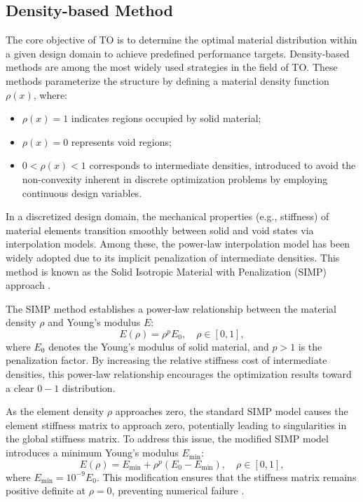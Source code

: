 \documentclass[mathpazo]{cicp}
\begin{document}
\subsection{Density-based Method}
The core objective of TO is to determine the optimal material distribution within a given design domain to achieve predefined performance targets. Density-based methods are among the most widely used strategies in the field of TO. These methods parameterize the structure by defining a material density function $\rho(x)$, where:
\begin{itemize}
	\item $\rho(x) = 1$ indicates regions occupied by solid material;
	\item $\rho(x) = 0$ represents void regions;
	\item $0 < \rho(x) < 1$ corresponds to intermediate densities, introduced to avoid the non-convexity inherent in discrete optimization problems by employing continuous design variables.
\end{itemize}

In a discretized design domain, the mechanical properties (e.g., stiffness) of material elements transition smoothly between solid and void states via interpolation models\cite{bendsoe1989optimal}. Among these, the power-law interpolation model has been widely adopted due to its implicit penalization of intermediate densities. This method is known as the Solid Isotropic Material with Penalization (SIMP) approach \cite{zhou1991coc}.

The SIMP method establishes a power-law relationship between the material density $\rho$ and Young's modulus $E$:
\begin{equation*}
	E(\rho) = \rho^p E_0,\quad \rho \in [0,1],
\end{equation*}
where $E_0$ denotes the Young's modulus of solid material, and $p>1$ is the penalization factor. By increasing the relative stiffness cost of intermediate densities, this power-law relationship encourages the optimization results toward a clear $0-1$ distribution.

As the element density $\rho$ approaches zero, the standard SIMP model causes the element stiffness matrix to approach zero, potentially leading to singularities in the global stiffness matrix. To address this issue, the modified SIMP model introduces a minimum Young's modulus $E_{\min}$:
\begin{equation*}
	E(\rho) = E_{\min} + \rho^p(E_0 - E_{\min}),\quad \rho \in [0,1],
\end{equation*}
where $E_{\min} = 10^{-9} E_0$. This modification ensures that the stiffness matrix remains positive definite at $\rho = 0$, preventing numerical failure \cite{sigmund2007morphology}.
\end{document}
